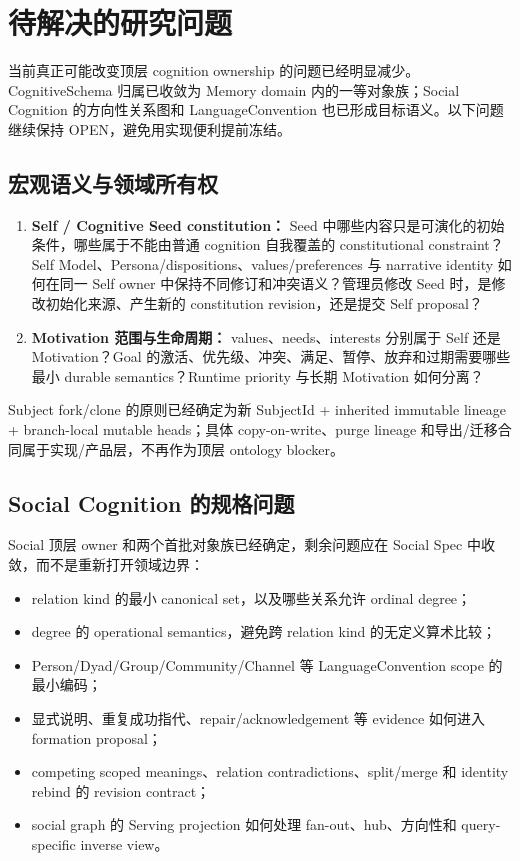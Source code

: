 \chapter{待解决的研究问题}

当前真正可能改变顶层 cognition ownership 的问题已经明显减少。CognitiveSchema 归属已收敛为 Memory domain 内的一等对象族；Social Cognition 的方向性关系图和 LanguageConvention 也已形成目标语义。以下问题继续保持 OPEN，避免用实现便利提前冻结。

\section{宏观语义与领域所有权}

\begin{enumerate}
\item \textbf{Self / Cognitive Seed constitution：} Seed 中哪些内容只是可演化的初始条件，哪些属于不能由普通 cognition 自我覆盖的 constitutional constraint？Self Model、Persona/dispositions、values/preferences 与 narrative identity 如何在同一 Self owner 中保持不同修订和冲突语义？管理员修改 Seed 时，是修改初始化来源、产生新的 constitution revision，还是提交 Self proposal？
\item \textbf{Motivation 范围与生命周期：} values、needs、interests 分别属于 Self 还是 Motivation？Goal 的激活、优先级、冲突、满足、暂停、放弃和过期需要哪些最小 durable semantics？Runtime priority 与长期 Motivation 如何分离？
\end{enumerate}

Subject fork/clone 的原则已经确定为新 SubjectId + inherited immutable lineage + branch-local mutable heads；具体 copy-on-write、purge lineage 和导出/迁移合同属于实现/产品层，不再作为顶层 ontology blocker。

\section{Social Cognition 的规格问题}

Social 顶层 owner 和两个首批对象族已经确定，剩余问题应在 Social Spec 中收敛，而不是重新打开领域边界：

\begin{itemize}
\item relation kind 的最小 canonical set，以及哪些关系允许 ordinal degree；
\item degree 的 operational semantics，避免跨 relation kind 的无定义算术比较；
\item Person/Dyad/Group/Community/Channel 等 LanguageConvention scope 的最小编码；
\item 显式说明、重复成功指代、repair/acknowledgement 等 evidence 如何进入 formation proposal；
\item competing scoped meanings、relation contradictions、split/merge 和 identity rebind 的 revision contract；
\item social graph 的 Serving projection 如何处理 fan-out、hub、方向性和 query-specific inverse view。
\end{itemize}

